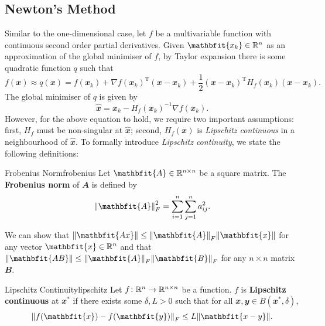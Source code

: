 \documentclass[math, code]{amznotes}
\theoremstyle{remark}
\begin{document}
\subsection{Newton's Method}
Similar to the one-dimensional case, let $f$ be a multivariable function with continuous second order partial derivatives. Given $\mathbfit{x_k} \in \R^n$ as an approximation of the global minimiser of $f$, by Taylor expansion there is some quadratic function $q$ such that
\begin{equation*}
    f(\mathbfit{x}) \approx q(\mathbfit{x}) = f(\mathbfit{x}_k) + \nabla f(\mathbfit{x}_k)^{\mathrm{T}}(\mathbfit{x} - \mathbfit{x}_k) + \frac{1}{2}(\mathbfit{x} - \mathbfit{x}_k)^{\mathrm{T}}H_f(\mathbfit{x}_k)(\mathbfit{x} - \mathbfit{x}_k).
\end{equation*}
The global minimiser of $q$ is given by
\begin{equation*}
    \hat{\mathbfit{x}} = \mathbfit{x}_k - H_f(\mathbfit{x}_k)^{-1}\nabla f(\mathbfit{x}_k).
\end{equation*}
However, for the above equation to hold, we require two important assumptions: first, $H_f$ must be non-singular at $\hat{\mathbfit{x}}$; second, $H_f(\mathbfit{x})$ is \textit{Lipschitz continuous} in a neighbourhood of $\hat{\mathbfit{x}}$. To formally introduce \textit{Lipschitz continuity}, we state the following definitions:
\begin{dfnbox}{Frobenius Norm}{frobenius}
    Let $\mathbfit{A} \in \R^{n \times n}$ be a square matrix. The {\color{red} \textbf{Frobenius norm}} of $\mathbfit{A}$ is defined by
    \begin{equation*}
        \norm{\mathbfit{A}}^2_F = \sum_{i = 1}^{n}\sum_{j = 1}^{n}a_{ij}^2.
    \end{equation*}
\end{dfnbox}
We can show that $\norm{\mathbfit{Ax}} \leq \norm{\mathbfit{A}}_F\norm{\mathbfit{x}}$ for any vector $\mathbfit{x} \in \R^n$ and that $\norm{\mathbfit{AB}} \leq \norm{\mathbfit{A}}_F\norm{\mathbfit{B}}_F$ for any $n \times n$ matrix $\mathbfit{B}$.
\begin{dfnbox}{Lipschitz Continuity}{lipschitz}
    Let $f \colon \mathbb{R}^n \to \mathbb{R}^{n \times n}$ be a function. $f$ is {\color{red} \textbf{Lipschitz continuous}} at $\mathbfit{x}^*$ if there exists some $\delta, L > 0$ such that for all $\mathbfit{x}, \mathbfit{y} \in B(\mathbfit{x}^*, \delta)$,
    \begin{equation*}
        \norm{f(\mathbfit{x}) - f(\mathbfit{y})}_F \leq L\norm{\mathbfit{x - y}}.
    \end{equation*}
\end{dfnbox}
\end{document}
